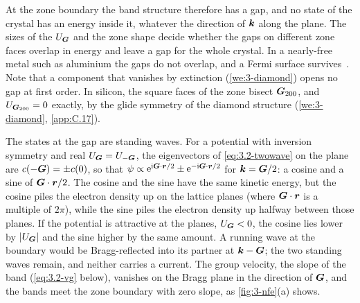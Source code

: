 At the zone boundary the band structure therefore has a gap, and no state of the crystal has an energy inside it, whatever the direction of $\bm{k}$ along the plane. The sizes of the $U_{\bm{G}}$ and the zone shape decide whether the gaps on different zone faces overlap in energy and leave a gap for the whole crystal. In a nearly-free metal such as aluminium the gaps do not overlap, and a Fermi surface survives~\cite[Chap.~9]{ashcroft1976solid}. Note that a component that vanishes by extinction (\cref{we:3-diamond}) opens no gap at first order. In silicon, the square faces of the zone bisect $\bm{G}_{200}$, and $U_{\bm{G}_{200}} = 0$ exactly, by the glide symmetry of the diamond structure (\cref{we:3-diamond}, \cref{app:C.17}).

The states at the gap are standing waves. For a potential with inversion symmetry and real $U_{\bm{G}} = U_{-\bm{G}}$, the eigenvectors of \cref{eq:3.2-twowave} on the plane are $c(-\bm{G}) = \pm c(0)$, so that $\psi \propto \mathrm{e}^{\mathrm{i}\bm{G}\cdot\bm{r}/2} \pm \mathrm{e}^{-\mathrm{i}\bm{G}\cdot\bm{r}/2}$ for $\bm{k} = \bm{G}/2$: a cosine and a sine of $\bm{G}\cdot\bm{r}/2$. The cosine and the sine have the same kinetic energy, but the cosine piles the electron density up on the lattice planes (where $\bm{G}\cdot\bm{r}$ is a multiple of $2\pi$), while the sine piles the electron density up halfway between those planes. If the potential is attractive at the planes, $U_{\bm{G}} < 0$, the cosine lies lower by $|U_{\bm{G}}|$ and the sine higher by the same amount. A running wave at the boundary would be Bragg-reflected into its partner at $\bm{k} - \bm{G}$; the two standing waves remain, and neither carries a current. The group velocity, the slope of the band (\cref{eq:3.2-vg} below), vanishes on the Bragg plane in the direction of $\bm{G}$, and the bands meet the zone boundary with zero slope, as \cref{fig:3-nfe}(a) shows.

